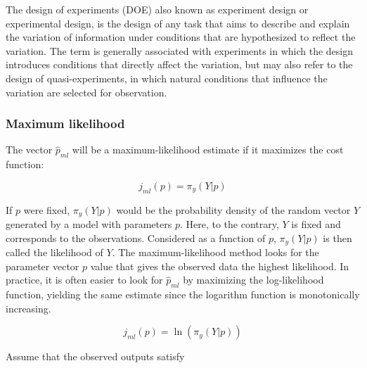 \documentclass[../Article_Design_of_Experiment.tex]{subfiles}
\begin{document}
	
	The design of experiments (DOE) also known as experiment design or experimental design, is the design of any task that aims to describe and explain the variation of information under conditions that are hypothesized to reflect the variation. The term is generally associated with experiments in which the design introduces conditions that directly affect the variation, but may also refer to the design of quasi-experiments, in which natural conditions that influence the variation are selected for observation. 
		
	\subsubsection{Maximum likelihood}
	
	The vector $\hat{p}_{ml}$ will be a maximum-likelihood estimate if it maximizes the cost function:
	
	{\footnotesize
	\begin{equation}
		j_{ml}(p) = \pi_y (Y|p) 
	\end{equation} }
	
	If $p$ were fixed, $\pi_y(Y|p)$ would be the probability density of the random vector $Y$ generated by a model with parameters $p$. Here, to the contrary, $Y$ is fixed and corresponds to the observations. Considered as a function of $p$, $\pi_y(Y|p)$ is then called the likelihood of $Y$. The maximum-likelihood method looks for the parameter vector $p$ value that gives the observed data the highest likelihood. In practice, it is often easier to look for $\hat{p}_{ml}$ by maximizing the log-likelihood function, yielding the same estimate since the logarithm function is monotonically increasing.
	
	{\footnotesize
	\begin{equation}
		j_{ml}(p) = \ln ( \pi_y (Y|p) )
	\end{equation} }
	
	Assume that the observed outputs satisfy 
	
\end{document}
